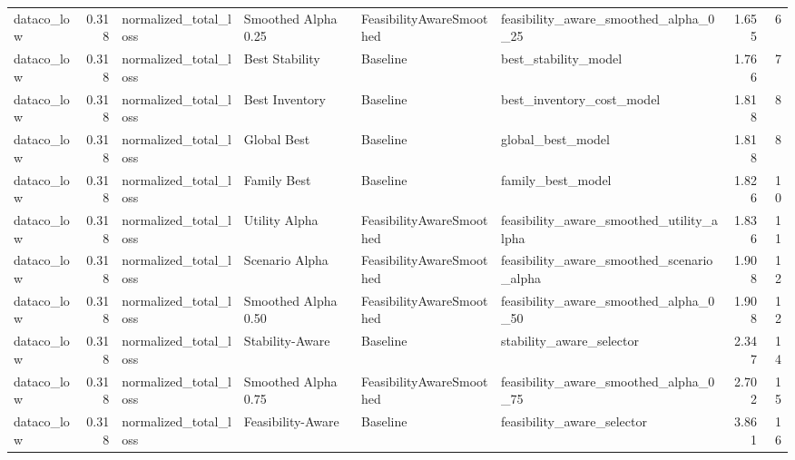 \begin{table}
{\begin{tabular}{lrllllrr}
    dataco\_low &             0.318 &       normalized\_total\_loss &   Smoothed Alpha 0.25 &  FeasibilityAwareSmoothed &              feasibility\_aware\_smoothed\_alpha\_0\_25 &         1.655 &               6 \\
    dataco\_low &             0.318 &       normalized\_total\_loss &        Best Stability &                  Baseline &                               best\_stability\_model &         1.766 &               7 \\
    dataco\_low &             0.318 &       normalized\_total\_loss &        Best Inventory &                  Baseline &                          best\_inventory\_cost\_model &         1.818 &               8 \\
    dataco\_low &             0.318 &       normalized\_total\_loss &           Global Best &                  Baseline &                                  global\_best\_model &         1.818 &               8 \\
    dataco\_low &             0.318 &       normalized\_total\_loss &           Family Best &                  Baseline &                                  family\_best\_model &         1.826 &              10 \\
    dataco\_low &             0.318 &       normalized\_total\_loss &         Utility Alpha &  FeasibilityAwareSmoothed &           feasibility\_aware\_smoothed\_utility\_alpha &         1.836 &              11 \\
    dataco\_low &             0.318 &       normalized\_total\_loss &        Scenario Alpha &  FeasibilityAwareSmoothed &          feasibility\_aware\_smoothed\_scenario\_alpha &         1.908 &              12 \\
    dataco\_low &             0.318 &       normalized\_total\_loss &   Smoothed Alpha 0.50 &  FeasibilityAwareSmoothed &              feasibility\_aware\_smoothed\_alpha\_0\_50 &         1.908 &              12 \\
    dataco\_low &             0.318 &       normalized\_total\_loss &       Stability-Aware &                  Baseline &                           stability\_aware\_selector &         2.347 &              14 \\
    dataco\_low &             0.318 &       normalized\_total\_loss &   Smoothed Alpha 0.75 &  FeasibilityAwareSmoothed &              feasibility\_aware\_smoothed\_alpha\_0\_75 &         2.702 &              15 \\
    dataco\_low &             0.318 &       normalized\_total\_loss &     Feasibility-Aware &                  Baseline &                         feasibility\_aware\_selector &         3.861 &              16 \\

\end{tabular}}
\end{table}

